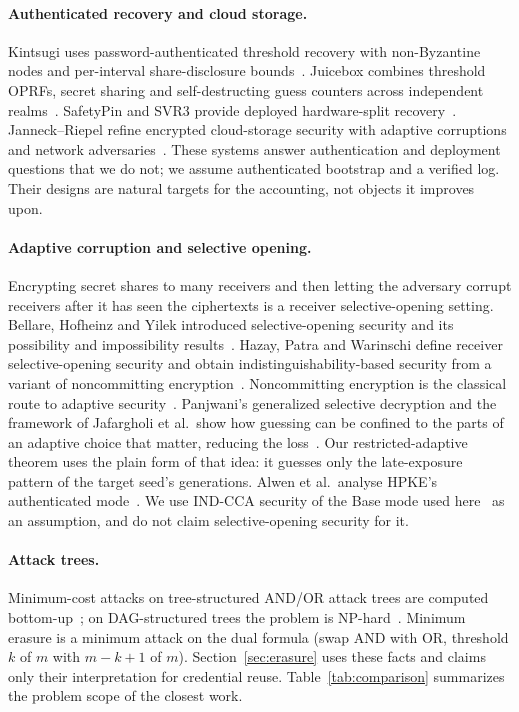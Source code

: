 \documentclass[pdflatex,sn-mathphys-num,twocolumn]{sn-jnl}
\theoremstyle{plain}
\theoremstyle{definition}
\begin{document}
\paragraph{Authenticated recovery and cloud storage.}
Kintsugi uses password-authenticated threshold recovery with non-Byzantine nodes and per-interval share-disclosure bounds~\cite{ma2025}. Juicebox combines threshold OPRFs, secret sharing and self-destructing guess counters across independent realms~\cite{trapp2025}. SafetyPin and SVR3 provide deployed hardware-split recovery~\cite{dauterman2020,connell2024}. Janneck--Riepel refine encrypted cloud-storage security with adaptive corruptions and network adversaries~\cite{janneck2026}. These systems answer authentication and deployment questions that we do not; we assume authenticated bootstrap and a verified log. Their designs are natural targets for the accounting, not objects it improves upon.

\paragraph{Adaptive corruption and selective opening.}
Encrypting secret shares to many receivers and then letting the adversary corrupt receivers after it has seen the ciphertexts is a receiver selective-opening setting. Bellare, Hofheinz and Yilek introduced selective-opening security and its possibility and impossibility results~\cite{bellare2009}. Hazay, Patra and Warinschi define receiver selective-opening security and obtain indistinguishability-based security from a variant of noncommitting encryption~\cite{hazay2015}. Noncommitting encryption is the classical route to adaptive security~\cite{canetti1996}. Panjwani's generalized selective decryption and the framework of Jafargholi et al.\ show how guessing can be confined to the parts of an adaptive choice that matter, reducing the loss~\cite{panjwani2007,jafargholi2017}. Our restricted-adaptive theorem uses the plain form of that idea: it guesses only the late-exposure pattern of the target seed's generations. Alwen et al.\ analyse HPKE's authenticated mode~\cite{alwen2021}. We use IND-CCA security of the Base mode used here~\cite{rfc9180} as an assumption, and do not claim selective-opening security for it.

\paragraph{Attack trees.}
Minimum-cost attacks on tree-structured AND/OR attack trees are computed bottom-up~\cite{mauw2005}; on DAG-structured trees the problem is NP-hard~\cite{lopuhaa2022}. Minimum erasure is a minimum attack on the dual formula (swap AND with OR, threshold $k$ of $m$ with $m-k+1$ of $m$). Section~\ref{sec:erasure} uses these facts and claims only their interpretation for credential reuse. Table~\ref{tab:comparison} summarizes the problem scope of the closest work.
\end{document}
